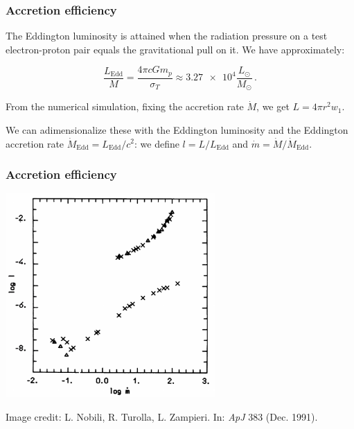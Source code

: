 \documentclass{beamer}
\begin{document}
\begin{frame}
    \frametitle{Accretion efficiency}
    The Eddington luminosity is attained when the radiation pressure on a test electron-proton pair equals the gravitational pull on it. We have approximately:

    \begin{equation*}
        \frac{L_{\text{Edd}}}{M} = \frac{4 \pi c G m_p}{\sigma_T} \approx \num{3.27e4} \frac{L_{\odot}}{M_{\odot}}  \,.
    \end{equation*}

    From the numerical simulation, fixing the accretion rate \(\dot{M}\), we get \(L = 4 \pi r^2 w_1\).

    We can adimensionalize these with the Eddington luminosity and the Eddington accretion rate \(\dot{M}_{\text{Edd}} = L_{\text{Edd}} / c^2\):
    we define \(l = L / L_{\text{Edd}}\) and \(\dot{m} = \dot{M} /\dot{M}_{\text{Edd}}\).
\end{frame}

\begin{frame}
    \frametitle{Accretion efficiency}
    \centering
    \includegraphics[width=0.6\textwidth]{../figures/logl-logm}

    {\tiny Image credit: L. Nobili, R. Turolla, L. Zampieri. In: \emph{ApJ} 383 (Dec. 1991).}
\end{frame}
\end{document}
